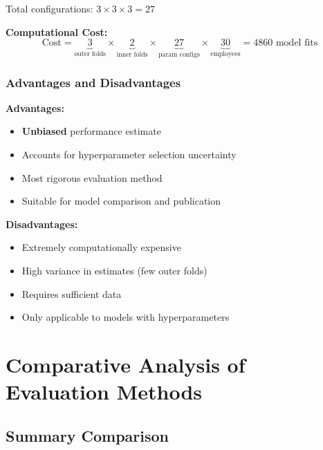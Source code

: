 \documentclass[12pt,a4paper]{article}
\begin{document}
Total configurations: $3 \times 3 \times 3 = 27$

\textbf{Computational Cost:}
\begin{equation}
\text{Cost} = \underbrace{3}_{\text{outer folds}} \times \underbrace{2}_{\text{inner folds}} \times \underbrace{27}_{\text{param configs}} \times \underbrace{30}_{\text{employees}} = 4860 \text{ model fits}
\end{equation}

\subsubsection{Advantages and Disadvantages}

\textbf{Advantages:}
\begin{itemize}
    \item \textbf{Unbiased} performance estimate
    \item Accounts for hyperparameter selection uncertainty
    \item Most rigorous evaluation method
    \item Suitable for model comparison and publication
\end{itemize}

\textbf{Disadvantages:}
\begin{itemize}
    \item Extremely computationally expensive
    \item High variance in estimates (few outer folds)
    \item Requires sufficient data
    \item Only applicable to models with hyperparameters
\end{itemize}

\section{Comparative Analysis of Evaluation Methods}

\subsection{Summary Comparison}
\end{document}
